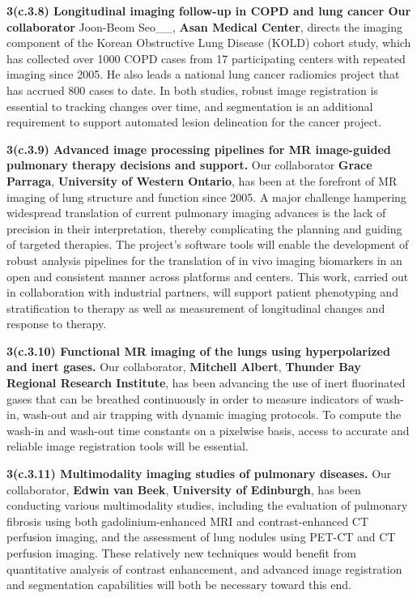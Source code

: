 \documentclass[11pt,]{article}
\begin{document}
\textbf{3(c.3.8) Longitudinal imaging follow-up in COPD and lung cancer
Our collaborator }Joon-Beom Seo\_\_, \textbf{Asan Medical Center},
directs the imaging component of the Korean Obstructive Lung Disease
(KOLD) cohort study, which has collected over 1000 COPD cases from 17
participating centers with repeated imaging since 2005. He also leads a
national lung cancer radiomics project that has accrued 800 cases to
date. In both studies, robust image registration is essential to
tracking changes over time, and segmentation is an additional
requirement to support automated lesion delineation for the cancer
project.

\textbf{3(c.3.9) Advanced image processing pipelines for MR image-guided
pulmonary therapy decisions and support.} Our collaborator \textbf{Grace
Parraga}, \textbf{University of Western Ontario}, has been at the
forefront of MR imaging of lung structure and function since 2005. A
major challenge hampering widespread translation of current pulmonary
imaging advances is the lack of precision in their interpretation,
thereby complicating the planning and guiding of targeted therapies. The
project's software tools will enable the development of robust analysis
pipelines for the translation of in vivo imaging biomarkers in an open
and consistent manner across platforms and centers. This work, carried
out in collaboration with industrial partners, will support patient
phenotyping and stratification to therapy as well as measurement of
longitudinal changes and response to therapy.

\textbf{3(c.3.10) Functional MR imaging of the lungs using
hyperpolarized and inert gases.} Our collaborator, \textbf{Mitchell
Albert}, \textbf{Thunder Bay Regional Research Institute}, has been
advancing the use of inert fluorinated gases that can be breathed
continuously in order to measure indicators of wash-in, wash-out and air
trapping with dynamic imaging protocols. To compute the wash-in and
wash-out time constants on a pixelwise basis, access to accurate and
reliable image registration tools will be essential.

\textbf{3(c.3.11) Multimodality imaging studies of pulmonary diseases.}
Our collaborator, \textbf{Edwin van Beek}, \textbf{University of
Edinburgh}, has been conducting various multimodality studies, including
the evaluation of pulmonary fibrosis using both gadolinium-enhanced MRI
and contrast-enhanced CT perfusion imaging, and the assessment of lung
nodules using PET-CT and CT perfusion imaging. These relatively new
techniques would benefit from quantitative analysis of contrast
enhancement, and advanced image registration and segmentation
capabilities will both be necessary toward this end.
\end{document}
